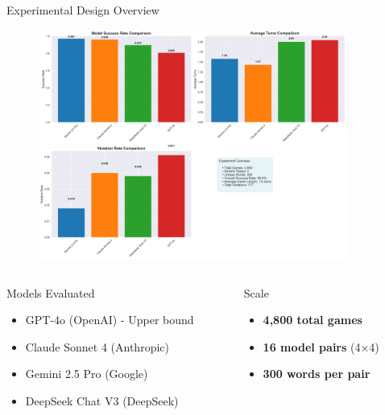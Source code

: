\documentclass[aspectratio=169]{beamer}
\begin{document}
\begin{frame}{Experimental Design Overview}
\begin{center}
\begin{figure}[h]
\centering
\includegraphics[width=0.9\textwidth]{comprehensive_figures/figure1_overview.png}
\end{figure}
\end{center}

\vspace{0.5cm}
\begin{columns}
\begin{column}{0.5\textwidth}
\begin{block}{Models Evaluated}
\begin{itemize}
    \item GPT-4o (OpenAI) - Upper bound
    \item Claude Sonnet 4 (Anthropic)
    \item Gemini 2.5 Pro (Google)
    \item DeepSeek Chat V3 (DeepSeek)
\end{itemize}
\end{block}
\end{column}

\begin{column}{0.5\textwidth}
\begin{block}{Scale}
\begin{itemize}
    \item \textbf{4,800 total games}
    \item \textbf{16 model pairs} (4×4)
    \item \textbf{300 words per pair}
\end{itemize}
\end{block}
\end{column}
\end{columns}
\end{frame}
\end{document}
